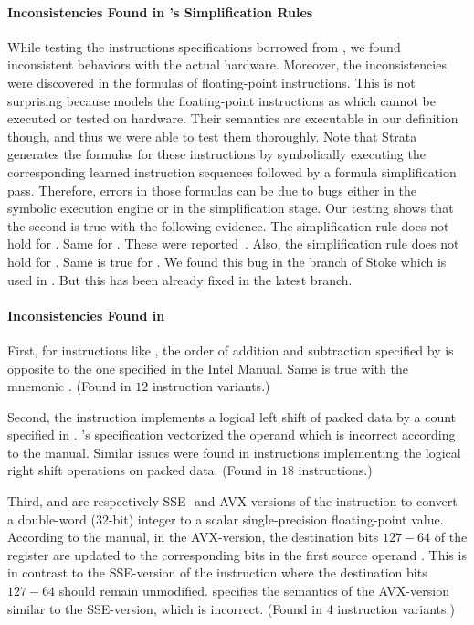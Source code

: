 \paragraph{Inconsistencies Found in \Strata's Simplification Rules}
While testing the instructions specifications borrowed from \Strata, we found inconsistent behaviors with the actual hardware. Moreover, the inconsistencies were discovered in the formulas of floating-point instructions. This is not surprising because \Strata models the floating-point instructions as \uif{} which cannot be executed or tested on hardware. Their semantics are executable in our definition though, and thus we were able to test them thoroughly. Note that Strata generates the formulas for these instructions by symbolically  executing  the corresponding learned  instruction sequences followed by a formula simplification pass. Therefore, errors in those formulas can be due to bugs either in the symbolic execution engine or in the simplification stage. Our testing shows that the second is true with the following evidence.
The simplification rule  does not hold for . Same for . These were reported~\cite{PC1}.
Also, the simplification rule  does not hold for .  Same is true for . We found this bug in the  branch of Stoke which is used in \Strata. But this has been already fixed in the latest \Stoke branch.

\paragraph{Inconsistencies Found in \Stoke}

First, for instructions like  , the order of addition and subtraction specified by \Stoke is opposite to the one specified in the Intel Manual. Same is true with the mnemonic . (Found in $12$ instruction variants.)

Second, the instruction  implements a logical left shift of packed data by a count specified in . \Stoke's specification vectorized the operand  which is incorrect according to the manual. Similar issues were found in instructions implementing the logical right shift operations on packed data. (Found in  $18$ instructions.)

Third,    and     are respectively SSE- and AVX-versions of the instruction to  convert a double-word ($32$-bit) integer to a scalar single-precision floating-point value. According to the manual, in the AVX-version,  the  destination bits $127-64$ of the  register  are updated to the corresponding bits in the first source operand . This  is in contrast to the SSE-version of the instruction where the destination bits $127-64$ should remain unmodified. \Stoke specifies the semantics of the AVX-version similar to the SSE-version, which is incorrect.  (Found in $4$ instruction variants.)

